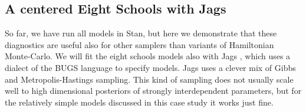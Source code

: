 \documentclass[american,]{article}
\let\oldparagraph\paragraph
\renewcommand{\paragraph}[1]{\oldparagraph{#1}\mbox{}}
\begin{document}



\hypertarget{eight-schools-with-jags}{%
\subsection*{A centered Eight Schools with Jags}\label{eight-schools-with-jags}}

So far, we have run all models in Stan, but here we demonstrate that
these diagnostics are useful also for other samplers than variants of
Hamiltonian Monte-Carlo.  We will fit the eight schools models also
with Jags \citep{plummer2003jags}, which uses a dialect of the BUGS
language \citep{lunn2009bugs} to specify models. Jags uses a clever
mix of Gibbs and Metropolis-Hastings sampling. This kind of sampling
does not usually scale well to high dimensional posteriors of strongly
interdependent parameters, but for the relatively simple models
discussed in this case study it works just fine.



\end{document}
